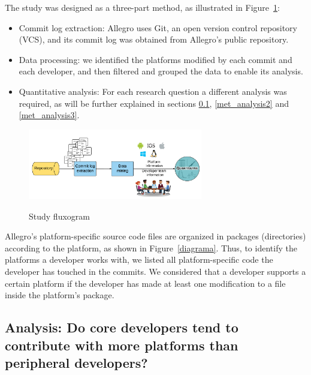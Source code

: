 \documentclass[10pt, conference]{IEEEtran}
\begin{document}
The study was designed as a three-part method, as illustrated in Figure~\ref{metodologia}: 

\begin{itemize}
\item Commit log extraction: Allegro uses Git, an open version control repository (VCS), and its commit log was obtained from Allegro's public repository.
\item Data processing: we identified the platforms modified by each commit and each developer, and then filtered and grouped the data to enable its analysis.
\item Quantitative analysis: %
For each research question a different analysis was required, as will be further explained in sections \ref{met_analysis1}, \ref{met_analysis2} and \ref{met_analysis3}.
\end{itemize}

\begin{figure}[h]
\centering
\textbf{}\includegraphics[width=3in]{metodologia}
\caption{Study fluxogram}
\label{metodologia}
\end{figure}

Allegro's platform-specific source code files are organized in packages (directories) according to the platform, as shown in Figure~\ref{diagrama}. Thus, to identify the platforms a developer works with, we listed all platform-specific code the developer has touched in the commits. We considered that a developer supports a certain platform if the developer has made at least one modification to a file inside the platform's package. 






\subsection{Analysis: Do core developers tend to contribute with more platforms than peripheral developers?}
\label{met_analysis1}
\end{document}
